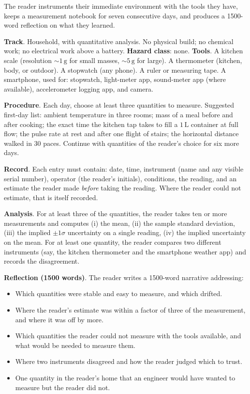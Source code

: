 \begin{project}
The reader instruments their immediate environment with the tools
they have, keeps a measurement notebook for seven consecutive days,
and produces a 1500-word reflection on what they learned.

\textbf{Track}. Household, with quantitative analysis. No physical
build; no chemical work; no electrical work above a battery.
\textbf{Hazard class}: none.
\textbf{Tools}. A kitchen scale (resolution $\sim 1 \,\si{\gram}$ for
small masses, $\sim 5 \,\si{\gram}$ for large). A thermometer
(kitchen, body, or outdoor). A stopwatch (any phone). A ruler or
measuring tape. A smartphone, used for: stopwatch, light-meter app,
sound-meter app (where available), accelerometer logging app, and
camera.

\textbf{Procedure}. Each day, choose at least three quantities to
measure. Suggested first-day list: ambient temperature in three
rooms; mass of a meal before and after cooking; the exact time the
kitchen tap takes to fill a $1 \,\si{\liter}$ container at full
flow; the pulse rate at rest and after one flight of stairs; the
horizontal distance walked in 30 paces. Continue with quantities of
the reader's choice for six more days.

\textbf{Record}. Each entry must contain: date, time, instrument
(name and any visible serial number), operator (the reader's
initials), conditions, the reading, and an estimate the reader made
\emph{before} taking the reading. Where the reader could not
estimate, that is itself recorded.

\textbf{Analysis}. For at least three of the quantities, the reader
takes ten or more measurements and computes (i) the mean, (ii) the
sample standard deviation, (iii) the implied $\pm 1\sigma$ uncertainty
on a single reading, (iv) the implied uncertainty on the mean. For at
least one quantity, the reader compares two different instruments
(say, the kitchen thermometer and the smartphone weather app) and
records the disagreement.

\textbf{Reflection (1500 words)}. The reader writes a 1500-word
narrative addressing:

\begin{itemize}[leftmargin=*]
  \item Which quantities were stable and easy to measure, and which
    drifted.
  \item Where the reader's estimate was within a factor of three of
    the measurement, and where it was off by more.
  \item Which quantities the reader could not measure with the tools
    available, and what would be needed to measure them.
  \item Where two instruments disagreed and how the reader judged
    which to trust.
  \item One quantity in the reader's home that an engineer would
    have wanted to measure but the reader did not.
\end{itemize}


\end{project}
